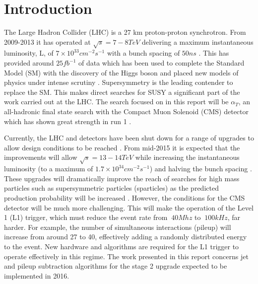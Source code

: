 
\chapter{Introduction} %

\label{Chapter1} %


The Large Hadron Collider (LHC) is a 27 km proton-proton synchrotron. From 2009-2013 it has operated at $\sqrt{s}=7-8TeV$ delivering a maximum instantaneous luminosity, L, of $7 \times 10^{33} cm^{-2}s^{-1}$ with a bunch spacing of $50ns$ \cite{run1}. This has provided around $25fb^{-1}$ of data which has been used to complete the Standard Model (SM) with the discovery of the Higgs boson and placed new models of physics under intense scrutiny \cite{cmshiggs}\cite{atlashiggs}\cite{susyr1}. Supersymmetry is the leading contender to replace the SM. This makes direct searches for SUSY a significant part of the work carried out at the LHC. The search focused on in this report will be $\alpha_T$, an all-hadronic final state search with the Compact Muon Solenoid (CMS) detector which has shown great strength in run 1 \cite{search}. 

Currently, the LHC and detectors have been shut down for a range of upgrades to allow design conditions to be reached \cite{ls1}. From mid-2015 it is expected that the improvements will allow $\sqrt{s}=13-14TeV$ while increasing the instantaneous luminosity (to a maximum of $1.7\times10^34cm^{-2}s^{-1}$) and halving the bunch spacing \cite{HighLumi}. These upgrades will dramatically improve the reach of searches for high mass particles such as supersymmetric particles (sparticles) as the predicted production probability will be increased \cite{ProjectedCx} . However, the conditions for the CMS detector will be much more challenging.  This will make the operation of the Level 1 (L1) trigger, which must reduce the event rate from $~40Mhz$ to $~100kHz$, far harder. For example, the number of simultaneous interactions (pileup) will increase from around 27 to 40, effectively adding a randomly distributed energy to the event. New hardware and algorithms are required for the L1 trigger to operate effectively in this regime. The work presented in this report concerns jet and pileup subtraction algorithms for the stage 2 upgrade expected to be implemented in 2016.  










